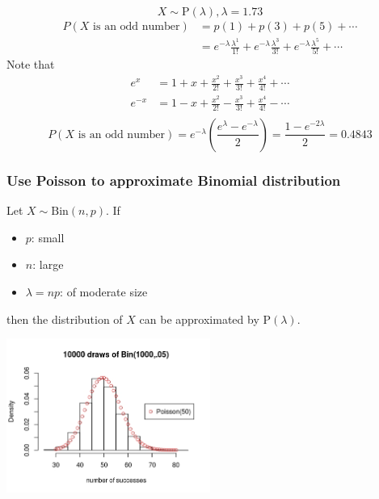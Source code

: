 \documentclass[slidestop,compress,mathserif]{beamer}
\begin{document}
\begin{frame}%

\pause
\[ X \sim \text{P}(\lambda),  \lambda = 1.73 \]
\begin{align*}
P(X \text{ is an odd number} ) &= p(1) + p(3) + p(5) + \cdots\\
& = e^{-\lambda} \frac{\lambda^1}{1!} + e^{-\lambda} \frac{\lambda^3}{3!} + e^{-\lambda} \frac{\lambda^5}{5!} + \cdots
\end{align*}
\pause
Note that \vspace{-0.5cm}
\begin{align*}
e^{x} & = 1 + x + \frac{x^2}{2!} + \frac{x^3}{3!} +\frac{x^4}{4!} +  \cdots \\
e^{-x} & = 1 - x + \frac{x^2}{2!} - \frac{x^3}{3!} +\frac{x^4}{4!} -  \cdots \\
\end{align*}
\vspace{-0.5cm}
\[P(X \text{ is an odd number} ) = e^{-\lambda} \left( \frac{e^{\lambda} - e^{-\lambda}}{2} \right) = \frac{1 - e^{-2\lambda}}{2} = 0.4843\]




\end{frame}



\begin{frame}\frametitle{Use Poisson to approximate Binomial distribution} %

Let $X \sim \text{Bin}(n, p)$. If
\begin{itemize}
\item $p$: small
\item $n$: large
\item $\lambda = np$: of moderate size
\end{itemize}
then the distribution of $X$ can be approximated by $\text{P}(\lambda)$.\\

\begin{center}
\includegraphics[width = 0.5\textwidth]{figures/poisson_approx_binom}
\end{center}

\end{frame}
\end{document}
